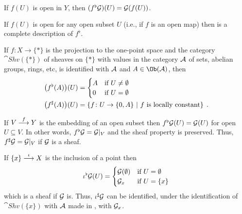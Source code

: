 \documentclass[a4paper,parskip=half,numbers=enddot, DIV=12]{scrreprt}
\begin{document}
    \begin{example}
        \begin{alphanumerate}
          \item 
            If $f(U)$ is open in $Y$, then $(f^\flat\mathcal{G})(U) = \mathcal{G}(f(U))$.
          \item 
            If $f(U)$ is open for any open subset $U$ (i.e., if $f$ is an open map) then  is a complete description of $f^\flat$.
          \item 
            If $f\colon X\to \{*\}$ is the projection to the one-point space and the category $\cat{Shv}(\{*\})$ of sheaves on $\{*\}$ with values in the category $\mathcal{A}$ of sets, abelian groups, rings, etc, is identified with $\mathcal{A}$ and $A\in\Ob(\Aa)$, then 
            \begin{align*}
                \big(f^\flat(A)\big)(U) &= \begin{cases} A &\text{if }U\neq\emptyset\\ 0 &\text{if } U= \emptyset \end{cases}\\
                \big(f^\sharp(A)\big)(U) &= \left\{f\colon U \to \{0,A\}\ \middle|\  f \text{ is locally constant}\right\}\;.
            \end{align*}
          \item 
            If $V\morphism[f] Y$ is the embedding of an open subset then $f^\flat \mathcal{G}(U) = \mathcal{G}(U)$ for open $U\subseteq V$. In other words, $f^\flat \mathcal{G} = \mathcal{G}|_V$ and the sheaf property is preserved. Thus, $f^\sharp \mathcal{G} = \mathcal{G}|_V$ if $\mathcal{G}$ is a sheaf.
          \item 
            If $\{x\} \morphism[\iota] X$ is the inclusion of a point then 
            \begin{align*}
                \iota^\flat\mathcal{G}(U) = \begin{cases} \mathcal{G}(\emptyset) & \text{if }U = \emptyset \\ \mathcal{G}_x&\text{if }U = \{x\}\end{cases}
            \end{align*}
            which is a sheaf if $\mathcal{G}$ is. Thus, $\iota^\sharp\mathcal{G}$ can be identified, under the identification of $\cat{Shv}(\{x\})$ with $\mathcal{A}$ made in , with $\mathcal{G}_x$.
        \end{alphanumerate}
    \end{example}
\end{document}
